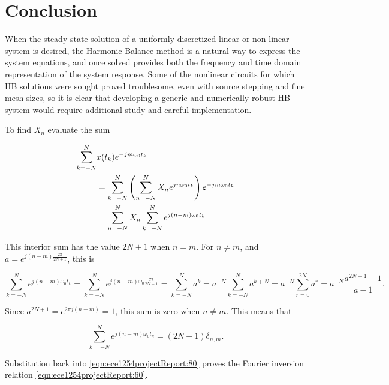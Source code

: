 \section{Conclusion}

When the steady state solution of a uniformly discretized linear or non-linear system is desired, the Harmonic Balance method is a natural way to express the system equations, and once solved provides both the frequency and time domain representation of the system response.  Some of the nonlinear circuits for which HB solutions were sought proved troublesome, even with source stepping and fine mesh sizes, so it is clear that developing a generic and numerically robust HB system would require additional study and careful implementation.

\appendices

\label{appendix:discreteFourierInversion}

To find \( X_n \) evaluate the sum

\begin{equation}\label{eqn:ece1254projectReport:80}
\begin{aligned}
\sum_{k = -N}^N &x(t_k) e^{-j m \omega_0 t_k} \\
&=
\sum_{k = -N}^N
\lr{
\sum_{n = -N}^N X_n e^{ j n \omega_0 t_k}
}
e^{-j m \omega_0 t_k} \\
&=
\sum_{n = -N}^N X_n
\sum_{k = -N}^N
e^{ j (n -m )\omega_0 t_k}
\end{aligned}
\end{equation}

This interior sum has the value \( 2 N + 1 \) when \( n = m \).
For \( n \ne m \), and
\( a = e^{j (n -m ) \frac{2 \pi}{2 N + 1}} \), this is

\begin{dmath}\label{eqn:ece1254projectReport:100}
\sum_{k = -N}^N
e^{ j (n -m )\omega_0 t_k}
=
\sum_{k = -N}^N
e^{ j (n -m )\omega_0 \frac{T k}{2 N + 1}}
=
\sum_{k = -N}^N a^k
=
a^{-N} \sum_{k = -N}^N a^{k+ N}
=
a^{-N} \sum_{r = 0}^{2 N} a^{r}
=
a^{-N} \frac{a^{2 N + 1} - 1}{a - 1}.
\end{dmath}

Since \( a^{2 N + 1} = e^{2 \pi j (n - m)} = 1 \), this sum is zero when \( n \ne m \).
This means that

\begin{equation}\label{eqn:ece1254projectReport:120}
\sum_{k = -N}^N
e^{ j (n -m )\omega_0 t_k} = (2 N + 1) \delta_{n,m}.
\end{equation}

Substitution back into \cref{eqn:ece1254projectReport:80} proves the Fourier inversion relation \cref{eqn:ece1254projectReport:60}.

